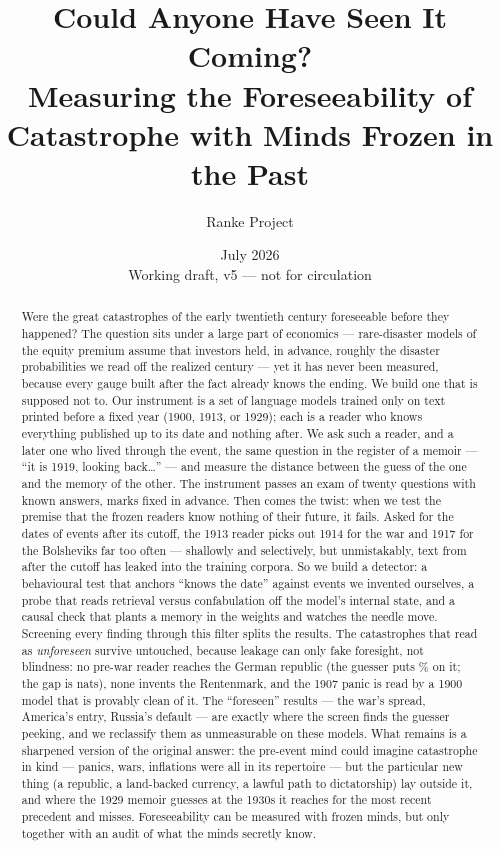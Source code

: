 \documentclass[11pt]{article}
\title{Could Anyone Have Seen It Coming?\\[2pt]
\large Measuring the Foreseeability of Catastrophe with Minds Frozen in the Past}
\author{Ranke Project}
\date{July 2026 \\[4pt] \small Working draft, v5 --- not for circulation}
\begin{document}
\maketitle

\begin{abstract}
\noindent Were the great catastrophes of the early twentieth century foreseeable before they happened?
The question sits under a large part of economics --- rare-disaster models of the equity premium assume
that investors held, in advance, roughly the disaster probabilities we read off the realized century ---
yet it has never been measured, because every gauge built after the fact already knows the ending. We
build one that is supposed not to. Our instrument is a set of language models trained only on text
printed before a fixed year (1900, 1913, or 1929); each is a reader who knows everything published up to
its date and nothing after. We ask such a reader, and a later one who lived through the event, the same
question in the register of a memoir --- ``it is 1919, looking back\ldots'' --- and measure the distance
between the guess of the one and the memory of the other. The instrument passes an exam of twenty
questions with known answers, marks fixed in advance. Then comes the twist: when we test the premise
that the frozen readers know nothing of their future, it fails. Asked for the dates of events after its
cutoff, the 1913 reader picks out 1914 for the war and 1917 for the Bolsheviks far too often ---
shallowly and selectively, but unmistakably, text from after the cutoff has leaked into the training
corpora. So we build a detector: a behavioural test that anchors ``knows the date'' against events we
invented ourselves, a probe that reads retrieval versus confabulation off the model's internal state,
and a causal check that plants a memory in the weights and watches the needle move. Screening every
finding through this filter splits the results. The catastrophes that read as \emph{unforeseen} survive
untouched, because leakage can only fake foresight, not blindness: no pre-war reader reaches the German
republic (the guesser puts \NkaiserPreImplied\% on it; the gap is \NkaiserGap{} nats), none invents the
Rentenmark, and the 1907 panic is read by a 1900 model that is provably clean of it. The ``foreseen''
results --- the war's spread, America's entry, Russia's default --- are exactly where the screen finds
the guesser peeking, and we reclassify them as unmeasurable on these models. What remains is a sharpened
version of the original answer: the pre-event mind could imagine catastrophe in kind --- panics, wars,
inflations were all in its repertoire --- but the particular new thing (a republic, a land-backed
currency, a lawful path to dictatorship) lay outside it, and where the 1929 memoir guesses at the 1930s
it reaches for the most recent precedent and misses. Foreseeability can be measured with frozen minds,
but only together with an audit of what the minds secretly know.
\end{abstract}
\end{document}
